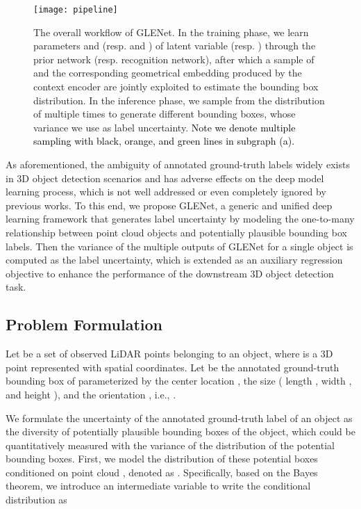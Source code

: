 \documentclass[twocolumn]{svjour3}
\newcommand{\revise}[1]{\textcolor{black}{#1}}
\begin{document}
\begin{figure*}[htp]
\centering
\texttt{[image: pipeline]} \caption{
The overall workflow of GLENet. In the training phase, we learn parameters  and  (resp.  and  ) of latent variable  (resp. ) through the prior network (resp. recognition network), after which a sample of  and the corresponding geometrical embedding produced by the context encoder are jointly exploited to estimate the bounding box distribution. In the inference phase, we sample from the distribution of  multiple times to generate different bounding boxes, whose variance we use as label uncertainty. \revise{Note we denote multiple sampling with black, orange, and green lines in subgraph (a).}
}
\label{fig:pipeline}
\end{figure*}

As aforementioned, the ambiguity of annotated ground-truth labels widely exists in 3D object detection scenarios and has adverse effects on the deep model learning process, which is not well addressed or even completely ignored by previous works. To this end, we propose GLENet, a generic and unified deep learning framework that generates label uncertainty by modeling the one-to-many relationship between point cloud objects and potentially plausible bounding box labels.
Then the variance of the multiple outputs of GLENet for a single object is computed as the label uncertainty, which is extended as an auxiliary regression objective to enhance the performance of the downstream 3D object detection task.










\subsection{Problem Formulation } Let  be a set of  observed LiDAR points belonging to an object, where  is a 3D point represented with spatial coordinates. Let  be the annotated ground-truth bounding box of  parameterized by the center location , the size ( length  , width , and height ), and the orientation , i.e., .

We formulate the uncertainty of the annotated ground-truth label of an object as the diversity of potentially plausible bounding boxes of the object, which could be quantitatively measured with the variance of the distribution of the potential bounding boxes.
First, we model 
the distribution of these potential boxes conditioned on point cloud , denoted as .  
Specifically, 
based on the Bayes theorem, we introduce an intermediate variable  to write the conditional distribution as 
\end{document}
